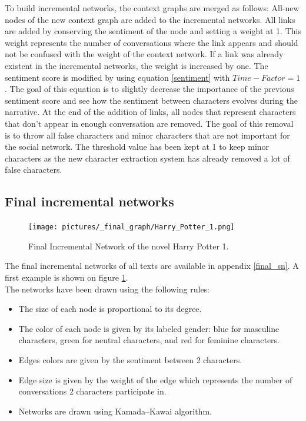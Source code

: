 \documentclass[a4paper, 12pt]{report}
\begin{document}
To build incremental networks, the context graphs are merged as follows: All-new nodes of the new context graph are added to the incremental networks.
All links are added by conserving the sentiment of the node and setting a weight at 1. This weight represents the number of conversations where the link appears and should not be confused with the weight of the context network. If a link was already existent in the incremental networks, the weight is increased by one.
The sentiment score is modified by using equation \ref{sentiment} with $Time-Factor = 1$.
The goal of this equation is to slightly decrease the importance of the previous sentiment score and see how the sentiment between characters evolves during the narrative.
At the end of the addition of links, all nodes that represent characters that don't appear in enough conversation are removed. The goal of this removal is to throw all false characters and minor characters that are not important for the social network. The threshold value has been kept at 1 to keep minor characters as the new character extraction system has already removed a lot of false characters.\\

\subsection{Final incremental networks}

\begin{figure}
\centering
\texttt{[image: pictures/\_final\_graph/Harry\_Potter\_1.png]}
\caption{Final Incremental Network of the novel Harry Potter 1.}
\label{sn_harry}
\end{figure}

The final incremental networks of all texts are available in appendix \ref{final_sn}. A first example is shown on figure \ref{sn_harry}.\\
The networks have been drawn using the following rules:
\begin{itemize}
\item The size of each node is proportional to its degree.
\item The color of each node is given by its labeled gender: blue for masculine characters, green for neutral characters, and red for feminine characters.
\item Edges colors are given by the sentiment between 2 characters.
\item Edge size is given by the weight of the edge which represents the number of conversations 2 characters participate in.
\item Networks are drawn using Kamada–Kawai algorithm.
\end{itemize}
\end{document}
